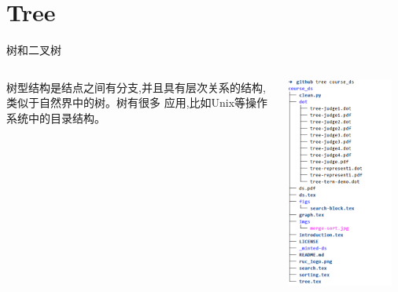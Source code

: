\section{Tree}


\begin{frame}[fragile]{树和二叉树}
  \begin{columns}[T]

    树型结构是结点之间有分支,并且具有层次关系的结构,类似于自然界中的树。树有很多
    应用,比如Unix等操作系统中的目录结构。

    \includegraphics[width=0.9\textwidth]{imgs/linux-tree.png}
  \end{columns}
\end{frame}

